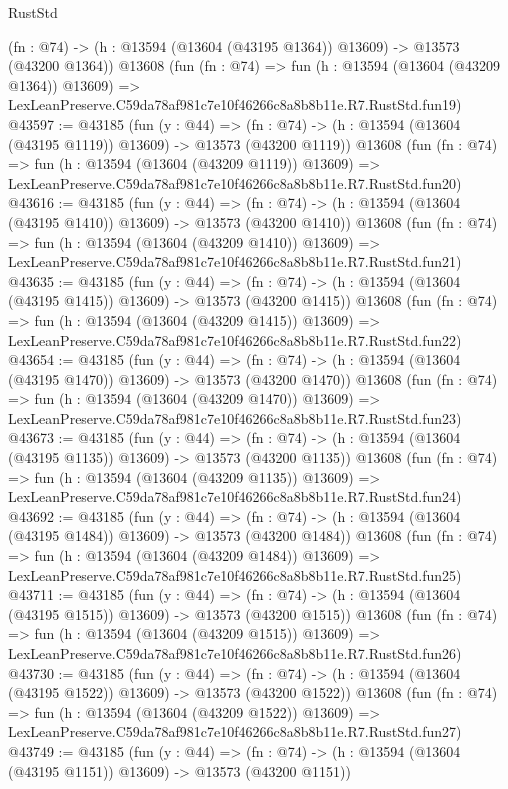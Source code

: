 \begin{lexlean}{RustStd}
\begin{coremodule}
    (fn : @74) -> (h : @13594 (@13604 (@43195 @1364)) @13609) -> @13573 (@43200 @1364))
    @13608
    (fun (fn : @74) =>
    fun (h : @13594 (@13604 (@43209 @1364)) @13609) =>
    LexLeanPreserve.C59da78af981c7e10f46266c8a8b8b11e.R7.RustStd.fun19)
@43597 := @43185
    (fun (y : @44) =>
    (fn : @74) -> (h : @13594 (@13604 (@43195 @1119)) @13609) -> @13573 (@43200 @1119))
    @13608
    (fun (fn : @74) =>
    fun (h : @13594 (@13604 (@43209 @1119)) @13609) =>
    LexLeanPreserve.C59da78af981c7e10f46266c8a8b8b11e.R7.RustStd.fun20)
@43616 := @43185
    (fun (y : @44) =>
    (fn : @74) -> (h : @13594 (@13604 (@43195 @1410)) @13609) -> @13573 (@43200 @1410))
    @13608
    (fun (fn : @74) =>
    fun (h : @13594 (@13604 (@43209 @1410)) @13609) =>
    LexLeanPreserve.C59da78af981c7e10f46266c8a8b8b11e.R7.RustStd.fun21)
@43635 := @43185
    (fun (y : @44) =>
    (fn : @74) -> (h : @13594 (@13604 (@43195 @1415)) @13609) -> @13573 (@43200 @1415))
    @13608
    (fun (fn : @74) =>
    fun (h : @13594 (@13604 (@43209 @1415)) @13609) =>
    LexLeanPreserve.C59da78af981c7e10f46266c8a8b8b11e.R7.RustStd.fun22)
@43654 := @43185
    (fun (y : @44) =>
    (fn : @74) -> (h : @13594 (@13604 (@43195 @1470)) @13609) -> @13573 (@43200 @1470))
    @13608
    (fun (fn : @74) =>
    fun (h : @13594 (@13604 (@43209 @1470)) @13609) =>
    LexLeanPreserve.C59da78af981c7e10f46266c8a8b8b11e.R7.RustStd.fun23)
@43673 := @43185
    (fun (y : @44) =>
    (fn : @74) -> (h : @13594 (@13604 (@43195 @1135)) @13609) -> @13573 (@43200 @1135))
    @13608
    (fun (fn : @74) =>
    fun (h : @13594 (@13604 (@43209 @1135)) @13609) =>
    LexLeanPreserve.C59da78af981c7e10f46266c8a8b8b11e.R7.RustStd.fun24)
@43692 := @43185
    (fun (y : @44) =>
    (fn : @74) -> (h : @13594 (@13604 (@43195 @1484)) @13609) -> @13573 (@43200 @1484))
    @13608
    (fun (fn : @74) =>
    fun (h : @13594 (@13604 (@43209 @1484)) @13609) =>
    LexLeanPreserve.C59da78af981c7e10f46266c8a8b8b11e.R7.RustStd.fun25)
@43711 := @43185
    (fun (y : @44) =>
    (fn : @74) -> (h : @13594 (@13604 (@43195 @1515)) @13609) -> @13573 (@43200 @1515))
    @13608
    (fun (fn : @74) =>
    fun (h : @13594 (@13604 (@43209 @1515)) @13609) =>
    LexLeanPreserve.C59da78af981c7e10f46266c8a8b8b11e.R7.RustStd.fun26)
@43730 := @43185
    (fun (y : @44) =>
    (fn : @74) -> (h : @13594 (@13604 (@43195 @1522)) @13609) -> @13573 (@43200 @1522))
    @13608
    (fun (fn : @74) =>
    fun (h : @13594 (@13604 (@43209 @1522)) @13609) =>
    LexLeanPreserve.C59da78af981c7e10f46266c8a8b8b11e.R7.RustStd.fun27)
@43749 := @43185
    (fun (y : @44) =>
    (fn : @74) -> (h : @13594 (@13604 (@43195 @1151)) @13609) -> @13573 (@43200 @1151))

\end{coremodule}
\end{lexlean}
